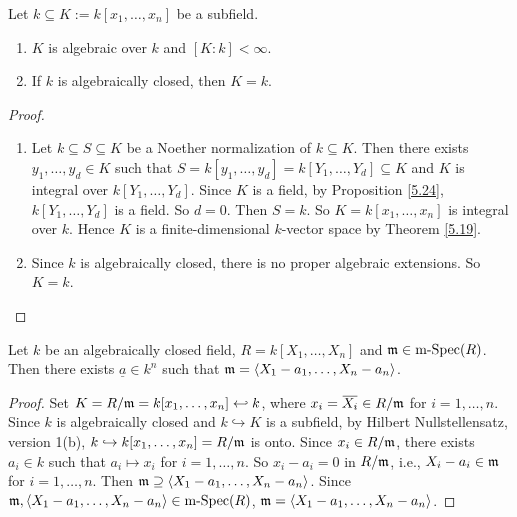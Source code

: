 
\begin{theorem}\label{5.41}
    Let $k \subseteq K := k[x_1,\ldots,x_n]$ be a subfield.
    \begin{enumerate}
        \item $K$ is algebraic over $k$ and $[K:k] < \infty$.
        \item If $k$ is algebraically closed, then $K = k$.
    \end{enumerate}
\end{theorem}

\begin{proof}
    \begin{enumerate}
        \item Let $k \subseteq S \subseteq K$ be a Noether normalization of $k \subseteq K$. Then there exists $y_1,\ldots,y_d \in K$ such that $S = k[y_1,\ldots,y_d] = k[Y_1,\ldots,Y_d] \subseteq K$ and $K$ is integral over $k[Y_1,\ldots,Y_d]$. Since $K$ is a field, by Proposition \ref{5.24}, $k[Y_1,\ldots,Y_d]$ is a field. So $d = 0$. Then $S = k$. So $K = k[x_1,\ldots,x_n]$ is integral over $k$. Hence $K$ is a finite-dimensional $k$-vector space by Theorem \ref{5.19}.
        \item Since $k$ is algebraically closed, there is no proper algebraic extensions. So $K = k$. \qedhere
    \end{enumerate}
\end{proof}

\begin{theorem}\label{5.42}
    Let $k$ be an algebraically closed field, $R = k[X_1,\ldots,X_n]$ and $\mathfrak{m} \in \operatorname{m-Spec}(R)$. Then there exists $\underline a \in k^{n}$ such that $\mathfrak{m} = \langle X_1-a_1,\ldots,X_n-a_n \rangle$.
\end{theorem}

\begin{proof}
    Set $K = R/\mathfrak{m} = k[x_1,\ldots,x_n] \hookleftarrow k$, where $x_i = \overbar{X_i} \in R/\ffm$ for $i = 1,\ldots,n$. Since $k$ is algebraically closed and $k \hookrightarrow K$ is a subfield, by Hilbert Nullstellensatz, version 1(b), $k \hookrightarrow k[x_1,\ldots,x_n] = R/\mathfrak{m}$ is onto. Since $x_i \in R/\mathfrak{m}$, there exists $a_i \in k$ such that $a_i \mapsto x_i$ for $i = 1,\ldots,n$. So $x_i - a_i = 0$ in $R/\mathfrak{m}$, i.e., $X_i - a_i \in \mathfrak{m}$ for $i = 1,\ldots,n$. Then $\mathfrak{m} \supseteq \langle X_1-a_1,\ldots,X_n-a_n \rangle$. Since $\mathfrak{m},\langle X_1-a_1,\ldots,X_n-a_n \rangle \in \operatorname{m-Spec}(R)$, $\mathfrak{m} = \langle X_1-a_1,\ldots,X_n-a_n \rangle$.
\end{proof}

